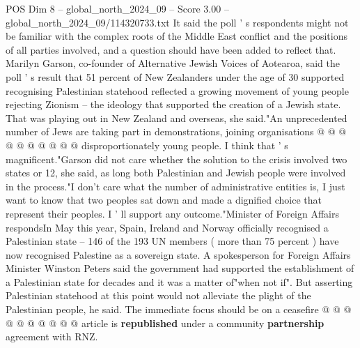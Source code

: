 \begin{textsample}{POS Dim 8 – global\_north\_2024\_09 – Score 3.00 – global\_north\_2024\_09/114320733.txt}
It said the poll ' s respondents might not be familiar with the complex roots of the Middle East conflict and the positions of all parties involved, and a question should have been added to reflect that.
Marilyn Garson, co-founder of Alternative Jewish Voices of Aotearoa, said the poll ' s result that 51 percent of New Zealanders under the age of 30 supported recognising Palestinian statehood reflected a growing movement of young people rejecting Zionism -- the ideology that supported the creation of a Jewish state.
That was playing out in New Zealand and overseas, she said."An unprecedented number of Jews are taking part in demonstrations, joining organisations @ @ @ @ @ @ @ @ @ @ disproportionately young people.
I think that ' s magnificent."Garson did not care whether the solution to the crisis involved two states or 12, she said, as long both Palestinian and Jewish people were involved in the process."I don't care what the number of administrative entities is, I just want to know that two peoples sat down and made a dignified choice that represent their peoples.
I ' ll support any outcome."Minister of Foreign Affairs respondsIn May this year, Spain, Ireland and Norway officially recognised a Palestinian state -- 146 of the 193 UN members ( more than 75 percent ) have now recognised Palestine as a sovereign state.
A spokesperson for Foreign Affairs Minister Winston Peters said the government had supported the establishment of a Palestinian state for decades and it was a matter of"when not if".
But asserting Palestinian statehood at this point would not alleviate the plight of the Palestinian people, he said.
The immediate focus should be on a ceasefire @ @ @ @ @ @ @ @ @ @ article is \textbf{republished} under a community \textbf{partnership} agreement with RNZ.

\end{textsample}
